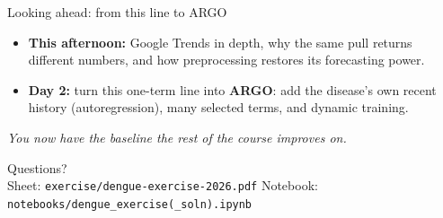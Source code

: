 \documentclass[aspectratio=169,11pt]{beamer}
\begin{document}
\begin{frame}{Looking ahead: from this line to ARGO}
  \begin{itemize}
    \item \textbf{This afternoon:} Google Trends in depth, why the same pull returns
          different numbers, and how preprocessing restores its forecasting power.
    \item \textbf{Day 2:} turn this one-term line into \textbf{ARGO}: add the disease's own
          recent history (autoregression), many selected terms, and dynamic training.
  \end{itemize}
  \vfill
  \begin{center}
    \itshape You now have the baseline the rest of the course improves on.
  \end{center}
\end{frame}

\begin{frame}[standout]
  Questions?\\[0.4em]
  \small Sheet: \texttt{exercise/dengue-exercise-2026.pdf} \quad\textbullet\quad
  Notebook: \texttt{notebooks/dengue\_exercise(\_soln).ipynb}
\end{frame}
\end{document}
